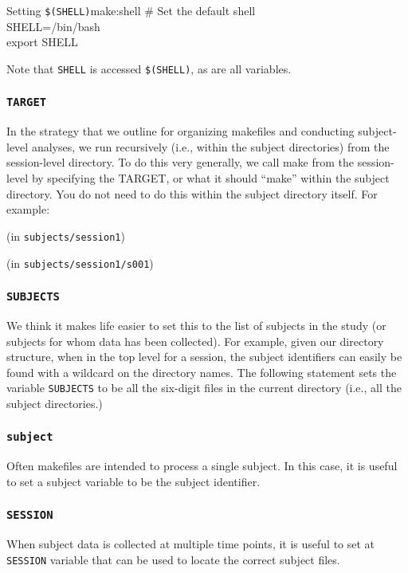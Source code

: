 \begin{make}{Setting \texttt{\$(SHELL)}}{make:shell}
	\# Set the default shell \\
	SHELL=/bin/bash \\
	export SHELL
\end{make}

Note that \texttt{SHELL} is accessed \texttt{\$(SHELL)}, as are all \maken{} variables. 

\subsubsection{\texttt{TARGET}}
In the strategy that we outline for organizing makefiles and conducting subject-level analyses, we run \maken{} recursively (i.e., within the subject directories) from the session-level directory. To do this very generally, we call make from the session-level by specifying the TARGET, or what it should ``make'' within the subject directory. You do not need to do this within the subject directory itself. For example:

(in \texttt{subjects/session1})

(in \texttt{subjects/session1/s001})

\subsubsection{\texttt{SUBJECTS}}
We think it makes life easier to set this to the list of subjects in the study (or subjects for whom data has been collected). For example, given our directory structure, when in the top level for a session, the subject identifiers can easily be found with a wildcard on the directory names. The following statement sets the variable \texttt{SUBJECTS} to be all the six-digit files in the current directory (i.e., all the subject directories.) 


\subsubsection{\texttt{subject}}
Often makefiles are intended to process a single subject. In this case, it is useful to set a subject variable to be the subject identifier.

\subsubsection{\texttt{SESSION}}
When subject data is collected at multiple time points, it is useful to set at \texttt{SESSION} variable that can be used to locate the correct subject files. 

